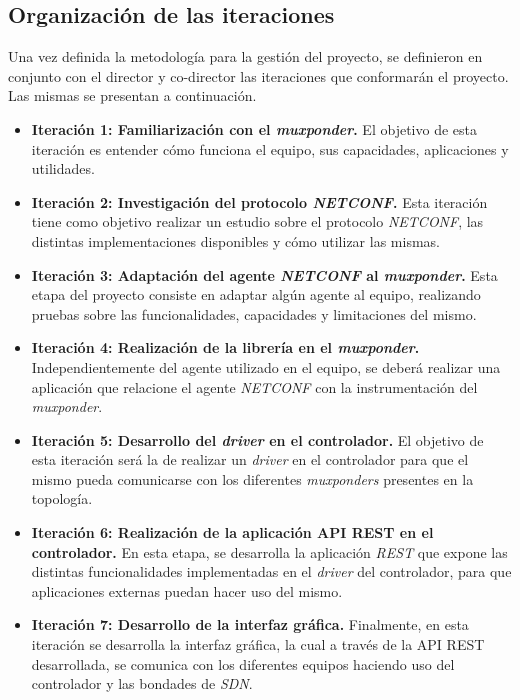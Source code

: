 \subsection{Organización de las iteraciones}
Una vez definida la metodología para la gestión del proyecto, se definieron en conjunto con el director y co-director las iteraciones que conformarán el proyecto. Las mismas se presentan a continuación.
\begin{itemize}
	\item \textbf{Iteración 1: Familiarización con el \textit{muxponder}.} El objetivo de esta iteración es entender cómo funciona el equipo, sus capacidades, aplicaciones y utilidades.
	\item \textbf{Iteración 2: Investigación del protocolo \textit{NETCONF}.} Esta iteración tiene como objetivo realizar un estudio sobre el protocolo \textit{NETCONF}, las distintas implementaciones disponibles y cómo utilizar las mismas.
	\item \textbf{Iteración 3: Adaptación del agente \textit{NETCONF} al \textit{muxponder}.} Esta etapa del proyecto consiste en adaptar algún agente al equipo, realizando pruebas sobre las funcionalidades, capacidades y limitaciones del mismo.
	\item \textbf{Iteración 4: Realización de la librería en el \textit{muxponder}.} Independientemente del agente utilizado en el equipo, se deberá realizar una aplicación que relacione el agente \textit{NETCONF} con la instrumentación del \textit{muxponder}.
	\item \textbf{Iteración 5: Desarrollo del \textit{driver} en el controlador.} El objetivo de esta iteración será la de realizar un \textit{driver} en el controlador para que el mismo pueda comunicarse con los diferentes \textit{muxponders} presentes en la topología.
	\item \textbf{Iteración 6: Realización de la aplicación API REST en el controlador.} En esta etapa, se desarrolla la aplicación \textit{REST} que expone las distintas funcionalidades implementadas en el \textit{driver} del controlador, para que aplicaciones externas puedan hacer uso del mismo.
	\item \textbf{Iteración 7: Desarrollo de la interfaz gráfica.} Finalmente, en esta iteración se desarrolla la interfaz gráfica, la cual a través de la API REST desarrollada, se comunica con los diferentes equipos haciendo uso del controlador y las bondades de \textit{SDN}.
\end{itemize}


